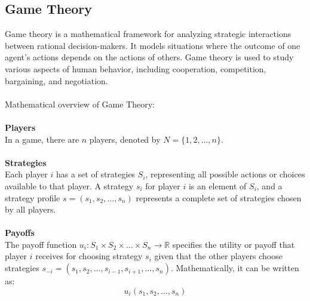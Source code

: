\documentclass[12pt]{report}
\begin{document}
\subsection{Game Theory}\label{gt}
Game theory is a mathematical framework for analyzing strategic
interactions between rational decision-makers. It models situations where
the outcome of one agent's actions depends on the actions of others.
Game theory is used to study various aspects of human behavior, including
cooperation, competition, bargaining, and negotiation.\\
\\
Mathematical overview of Game Theory:\\
\\
\textbf{Players}\\
In a game, there are \(n\) players, denoted by \(N = \{1, 2, \ldots, n\}\).\\
\\
\textbf{Strategies}\\
Each player \(i\) has a set of strategies \(S_i\), representing all possible actions or choices available to that player. A strategy \(s_i\) for player \(i\) is an element of \(S_i\), and a strategy profile \(s = (s_1, s_2, \ldots, s_n)\) represents a complete set of strategies chosen by all players.\\
\\
\textbf{Payoffs}\\
The payoff function \(u_i : S_1 \times S_2 \times \ldots \times S_n \rightarrow \mathbb{R}\) specifies the utility or payoff that player \(i\) receives for choosing strategy \(s_i\) given that the other players choose strategies \(s_{-i} = (s_1, s_2, \ldots, s_{i-1}, s_{i+1}, \ldots, s_n)\). Mathematically, it can be written as:\\
\begin{equation}
    u_i(s_1, s_2, \ldots, s_n)
\end{equation}
\end{document}
